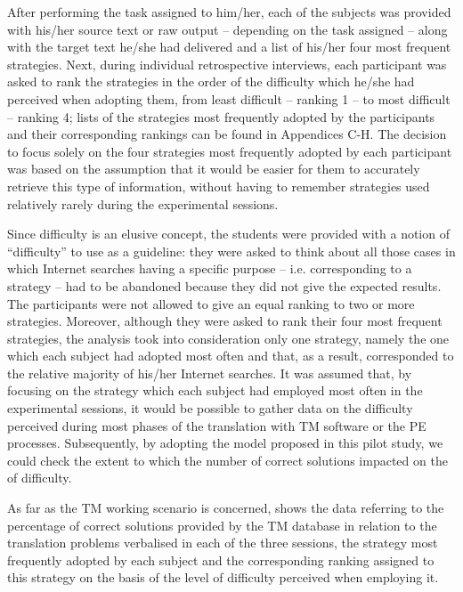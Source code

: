 \documentclass[output=paper]{LSP/langsci}
\begin{document}
After performing the task assigned to him/her, each of the subjects was provided with his/her source text or raw output -- depending on the task assigned -- along with the target text he/she had delivered and a list of his/her four most frequent strategies. Next, during individual retrospective interviews, each participant was asked to rank the strategies in the order of the difficulty which he/she had perceived when adopting them, from least difficult -- ranking 1 -- to most difficult -- ranking 4; lists of the strategies most frequently adopted by the participants and their corresponding rankings can be found in Appendices C-H. The decision to focus solely on the four strategies most frequently adopted by each participant was based on the assumption that it would be easier for them to accurately retrieve this type of information, without having to remember strategies used relatively rarely during the experimental sessions.


Since difficulty is an elusive concept, the students were provided with a notion of ``difficulty'' to use as a guideline: they were asked to think about all those cases in which Internet searches having a specific purpose -- i.e. corresponding to a strategy -- had to be abandoned because they did not give the expected results. The participants were not allowed to give an equal ranking to two or more strategies. Moreover, although they were asked to rank their four most frequent strategies, the analysis took into consideration only one strategy, namely the one which each subject had adopted most often and that, as a result, corresponded to the relative majority of his/her Internet searches. It was assumed that, by focusing on the strategy which each subject had employed most often in the experimental sessions, it would be possible to gather data on the difficulty perceived during most phases of the translation with TM software or the PE processes. Subsequently, by adopting the model proposed in this pilot study, we could check the extent to which the number of correct solutions impacted on the  of difficulty.


As far as the TM working scenario is concerned,  shows the data referring to the percentage of correct solutions provided by the TM database in relation to the translation problems verbalised in each of the three sessions, the strategy most frequently adopted by each subject and the corresponding ranking assigned to this strategy on the basis of the level of difficulty perceived when employing it.
\end{document}
